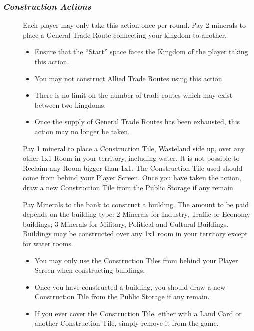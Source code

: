 \documentclass[10pt,twocolumn]{article}
\begin{document}
\subsubsection*{\textit{Construction Actions}}
\begin{description}
\item[] Each player may only take this action once per round. Pay 2 minerals to place a General Trade Route connecting your kingdom to another.
\begin{itemize}
\item Ensure that the ``Start'' space faces the Kingdom of the player taking this action.
\item You may not construct Allied Trade Routes using this action.
\item There is no limit on the number of trade routes which may exist between two kingdoms.
\item Once the supply of General Trade Routes has been exhausted, this action may no longer be taken.
\end{itemize}
\item[] Pay 1 mineral to place a Construction Tile, Wasteland side up, over any other 1x1 Room in your territory, including water. It is not possible to Reclaim any Room bigger than 1x1. The Construction Tile used should come from behind your Player Screen. Once you have taken the action, draw a new Construction Tile from the Public Storage if any remain.
\item[] Pay Minerals to the bank to construct a building. The amount to be paid depends on the building type: 2 Minerals for Industry, Traffic or Economy buildings; 3 Minerals for Military, Political and Cultural Buildings. Buildings may be constructed over any 1x1 room in your territory except for water rooms.
\begin{itemize}
\item You may only use the Construction Tiles from behind your Player Screen when constructing buildings.
\item Once you have constructed a building, you should draw a new Construction Tile from the Public Storage if any remain.
\item If you ever cover the Construction Tile, either with a Land Card or another Construction Tile, simply remove it from the game.
\end{itemize}
\end{description}
\end{document}
